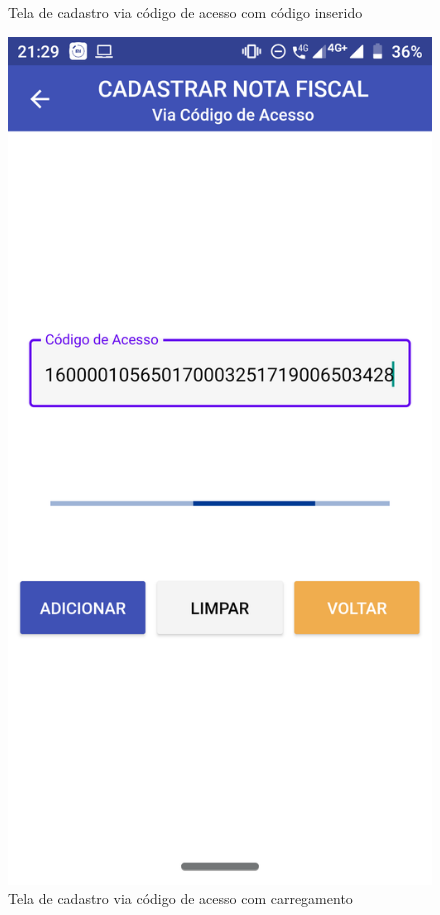 \begin{figure}[h]
    \caption{Tela de cadastro via código de acesso com código inserido}
    \label{appCodigoAcessoComCodigoFig}
\end{figure}

\begin{figure}[h]
    \centering
    \includegraphics[scale=0.15]{tcc/figures/app/app_codigo_acesso_loading.png}
    \caption{Tela de cadastro via código de acesso com carregamento}
    \label{appCodigoAcessoCarregamentoCaptchaFig}
\end{figure}

